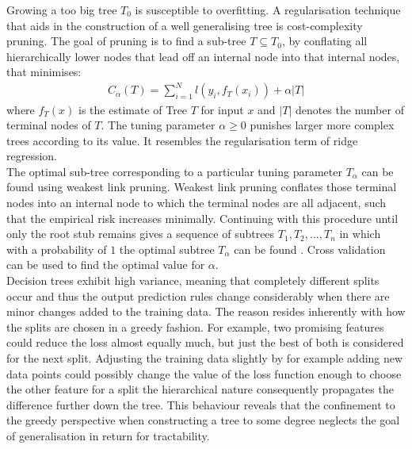 \documentclass[a4paper, 11pt]{article}
\begin{document}
Growing a too big tree $T_0$ is susceptible to overfitting. A regularisation technique that aids in the construction of a well generalising tree is cost-complexity pruning. The goal of pruning is to find a sub-tree $T \subseteq T_0$, by conflating all hierarchically lower nodes that lead off an internal node into that internal nodes, that minimises:
\begin{align*}
C_\alpha(T) = \sum_{i = 1}^{N} l(y_i, f_T(x_i)) + \alpha |T|
\end{align*}
where $f_T(x)$ is the estimate of Tree $T$ for input $x$ and $|T|$ denotes the number of terminal nodes of $T$. The tuning parameter $\alpha \geq 0$ punishes larger more complex trees according to its value. It resembles the regularisation term of ridge regression. \\
The optimal sub-tree corresponding to a particular tuning parameter $T_{\alpha}$ can be found using weakest link pruning. Weakest link pruning conflates those terminal nodes into an internal node to which the terminal nodes are all adjacent, such that the empirical risk increases minimally. Continuing with this procedure until only the root stub remains gives a sequence of subtrees $T_1, T_2, \ldots, T_n$ in which with a probability of $1$ the optimal subtree $T_{\alpha}$ can be found \cite{breiman1984classification}. Cross validation can be used to find the optimal value for $\alpha$.\\

Decision trees exhibit high variance, meaning that completely different splits occur and thus the output prediction rules change considerably when there are minor changes added to the training data. The reason resides inherently with how the splits are chosen in a greedy fashion. For example, two promising features could reduce the loss almost equally much, but just the best of both is considered for the next split. Adjusting the training data slightly by for example adding new data points could possibly change the value of the loss function enough to choose the other feature for a split the hierarchical nature consequently propagates the difference further down the tree. This behaviour reveals that the confinement to the greedy perspective when constructing a tree to some degree neglects the goal of generalisation in return for tractability.\\ 
\end{document}

